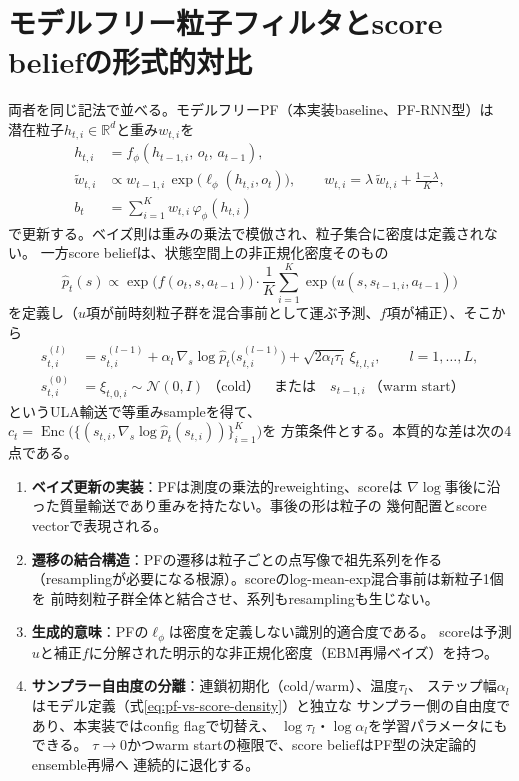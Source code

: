 \documentclass[a4paper,11pt]{article}
\begin{document}
\section{モデルフリー粒子フィルタとscore beliefの形式的対比}

両者を同じ記法で並べる。モデルフリーPF（本実装baseline、PF-RNN型）は
潜在粒子$h_{t,i}\in\mathbb R^{d}$と重み$w_{t,i}$を
\begin{align}
  h_{t,i}&=f_\phi(h_{t-1,i},\,o_t,\,a_{t-1}),\\
  \tilde w_{t,i}&\propto w_{t-1,i}\,
    \exp\bigl(\ell_\phi(h_{t,i},o_t)\bigr),\qquad
  w_{t,i}=\lambda\,\tilde w_{t,i}+\frac{1-\lambda}{K},\\
  b_t&=\sum_{i=1}^{K}w_{t,i}\,\varphi_\phi(h_{t,i})
\end{align}
で更新する。ベイズ則は重みの乗法で模倣され、粒子集合に密度は定義されない。
一方score beliefは、状態空間上の非正規化密度そのもの
\begin{equation}
  \hat p_t(s)\propto
    \exp\bigl(f(o_t,s,a_{t-1})\bigr)\cdot
    \frac1K\sum_{i=1}^{K}\exp\bigl(u(s,s_{t-1,i},a_{t-1})\bigr)
  \label{eq:pf-vs-score-density}
\end{equation}
を定義し（$u$項が前時刻粒子群を混合事前として運ぶ予測、$f$項が補正）、そこから
\begin{align}
  s^{(l)}_{t,i}&=s^{(l-1)}_{t,i}
    +\alpha_l\,\nabla_s\log\hat p_t\bigl(s^{(l-1)}_{t,i}\bigr)
    +\sqrt{2\alpha_l\tau_l}\,\xi_{t,l,i},\qquad l=1,\dots,L,\\
  s^{(0)}_{t,i}&=\xi_{t,0,i}\sim\mathcal N(0,I)\ \text{（cold）}
    \quad\text{または}\quad s_{t-1,i}\ \text{（warm start）}
  \label{eq:pf-vs-score-ula}
\end{align}
というULA輸送で等重みsampleを得て、
$c_t=\operatorname{Enc}\bigl(\{(s_{t,i},\nabla_s\log\hat p_t(s_{t,i}))\}_{i=1}^{K}\bigr)$を
方策条件とする。本質的な差は次の4点である。
\begin{enumerate}
  \item \textbf{ベイズ更新の実装}：PFは測度の乗法的reweighting、scoreは
    $\nabla\log$事後に沿った質量輸送であり重みを持たない。事後の形は粒子の
    幾何配置とscore vectorで表現される。
  \item \textbf{遷移の結合構造}：PFの遷移は粒子ごとの点写像で祖先系列を作る
    （resamplingが必要になる根源）。scoreのlog-mean-exp混合事前は新粒子1個を
    前時刻粒子群全体と結合させ、系列もresamplingも生じない。
  \item \textbf{生成的意味}：PFの$\ell_\phi$は密度を定義しない識別的適合度である。
    scoreは予測$u$と補正$f$に分解された明示的な非正規化密度（EBM再帰ベイズ）を持つ。
  \item \textbf{サンプラー自由度の分離}：連鎖初期化（cold/warm）、温度$\tau_l$、
    ステップ幅$\alpha_l$はモデル定義（式\eqref{eq:pf-vs-score-density}）と独立な
    サンプラー側の自由度であり、本実装ではconfig flagで切替え、
    $\log\tau_l$・$\log\alpha_l$を学習パラメータにもできる。
    $\tau\to0$かつwarm startの極限で、score beliefはPF型の決定論的ensemble再帰へ
    連続的に退化する。
\end{enumerate}
\end{document}
